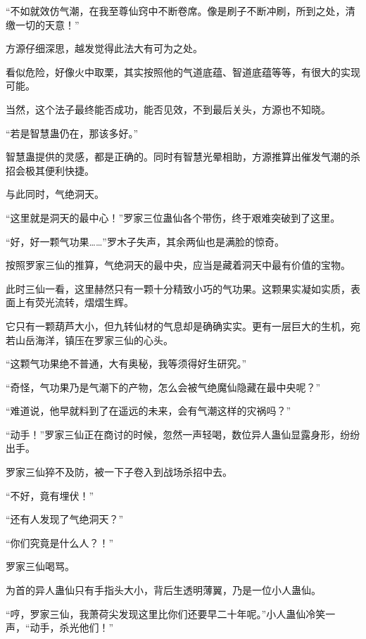 \begin{this_body}
“不如就效仿气潮，在我至尊仙窍中不断卷席。像是刷子不断冲刷，所到之处，清缴一切的天意！”

方源仔细深思，越发觉得此法大有可为之处。

看似危险，好像火中取栗，其实按照他的气道底蕴、智道底蕴等等，有很大的实现可能。

当然，这个法子最终能否成功，能否见效，不到最后关头，方源也不知晓。

“若是智慧蛊仍在，那该多好。”

智慧蛊提供的灵感，都是正确的。同时有智慧光晕相助，方源推算出催发气潮的杀招会极其便利快捷。

与此同时，气绝洞天。

“这里就是洞天的最中心！”罗家三位蛊仙各个带伤，终于艰难突破到了这里。

“好，好一颗气功果……”罗木子失声，其余两仙也是满脸的惊奇。

按照罗家三仙的推算，气绝洞天的最中央，应当是藏着洞天中最有价值的宝物。

此时三仙一看，这里赫然只有一颗十分精致小巧的气功果。这颗果实凝如实质，表面上有荧光流转，熠熠生辉。

它只有一颗葫芦大小，但九转仙材的气息却是确确实实。更有一层巨大的生机，宛若山岳海洋，镇压在罗家三仙的心头。

“这颗气功果绝不普通，大有奥秘，我等须得好生研究。”

“奇怪，气功果乃是气潮下的产物，怎么会被气绝魔仙隐藏在最中央呢？”

“难道说，他早就料到了在遥远的未来，会有气潮这样的灾祸吗？”

“动手！”罗家三仙正在商讨的时候，忽然一声轻喝，数位异人蛊仙显露身形，纷纷出手。

罗家三仙猝不及防，被一下子卷入到战场杀招中去。

“不好，竟有埋伏！”

“还有人发现了气绝洞天？”

“你们究竟是什么人？！”

罗家三仙喝骂。

为首的异人蛊仙只有手指头大小，背后生透明薄翼，乃是一位小人蛊仙。

“哼，罗家三仙，我萧荷尖发现这里比你们还要早二十年呢。”小人蛊仙冷笑一声，“动手，杀光他们！”

\end{this_body}

